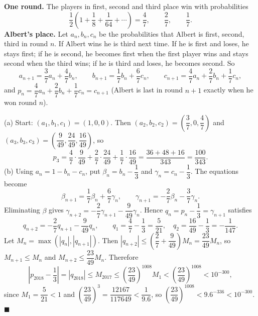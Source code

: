 \textbf{One round.} The players in first, second and third place win with probabilities
\[
\dfrac{1}{2}\left(1+\dfrac{1}{8}+\dfrac{1}{64}+\cdots\right)=\dfrac{4}{7},\qquad\dfrac{2}{7},\qquad\dfrac{1}{7} .
\]
\textbf{Albert's place.} Let $a_n,b_n,c_n$ be the probabilities that Albert is first, second, third in round $n$. If Albert wins he is third next time. If he is first and loses, he stays first; if he is second, he becomes first when the first player wins and stays second when the third wins; if he is third and loses, he becomes second. So
\[
a_{n+1}=\dfrac{3}{7}a_n+\dfrac{4}{7}b_n,\qquad b_{n+1}=\dfrac{1}{7}b_n+\dfrac{6}{7}c_n,\qquad c_{n+1}=\dfrac{4}{7}a_n+\dfrac{2}{7}b_n+\dfrac{1}{7}c_n ,
\]
and $p_n=\dfrac{4}{7}a_n+\dfrac{2}{7}b_n+\dfrac{1}{7}c_n=c_{n+1}$ (Albert is last in round $n+1$ exactly when he won round $n$).

(a) Start: $(a_1,b_1,c_1)=(1,0,0)$. Then $(a_2,b_2,c_2)=\left(\dfrac{3}{7},0,\dfrac{4}{7}\right)$ and $(a_3,b_3,c_3)=\left(\dfrac{9}{49},\dfrac{24}{49},\dfrac{16}{49}\right)$, so
\[
p_3=\dfrac{4}{7}\cdot\dfrac{9}{49}+\dfrac{2}{7}\cdot\dfrac{24}{49}+\dfrac{1}{7}\cdot\dfrac{16}{49}=\dfrac{36+48+16}{343}=\boxed{\dfrac{100}{343}}.
\]
(b) Using $a_n=1-b_n-c_n$, put $\beta_n=b_n-\dfrac{1}{3}$ and $\gamma_n=c_n-\dfrac{1}{3}$. The equations become
\[
\beta_{n+1}=\dfrac{1}{7}\beta_n+\dfrac{6}{7}\gamma_n,\qquad \gamma_{n+1}=-\dfrac{2}{7}\beta_n-\dfrac{3}{7}\gamma_n .
\]
Eliminating $\beta$ gives $\gamma_{n+2}=-\dfrac{2}{7}\gamma_{n+1}-\dfrac{9}{49}\gamma_n$. Hence $q_n=p_n-\dfrac{1}{3}=\gamma_{n+1}$ satisfies
\[
q_{n+2}=-\dfrac{2}{7}q_{n+1}-\dfrac{9}{49}q_n,\qquad q_1=\dfrac{4}{7}-\dfrac{1}{3}=\dfrac{5}{21},\quad q_2=\dfrac{16}{49}-\dfrac{1}{3}=-\dfrac{1}{147}.
\]
Let $M_n=\max(|q_n|,|q_{n+1}|)$. Then $|q_{n+2}|\le\left(\dfrac{2}{7}+\dfrac{9}{49}\right)M_n=\dfrac{23}{49}M_n$, so $M_{n+1}\le M_n$ and $M_{n+2}\le\dfrac{23}{49}M_n$. Therefore
\[
\left|p_{2018}-\dfrac{1}{3}\right|=|q_{2018}|\le M_{2017}\le\left(\dfrac{23}{49}\right)^{1008}M_1<\left(\dfrac{23}{49}\right)^{1008}<10^{-300},
\]
since $M_1=\dfrac{5}{21}<1$ and $\left(\dfrac{23}{49}\right)^{3}=\dfrac{12167}{117649}<\dfrac{1}{9.6}$, so $\left(\dfrac{23}{49}\right)^{1008}<9.6^{-336}<10^{-300}$. $\blacksquare$
